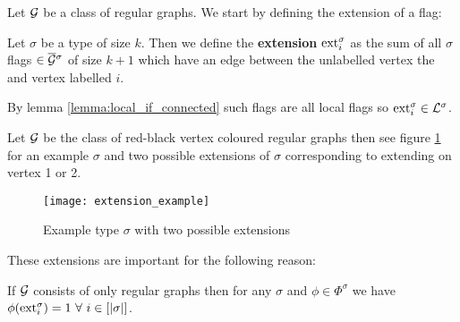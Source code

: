 Let $\mathcal{G}$ be a class of regular graphs.
We start by defining the extension of a flag:

\begin{definition}[Extension]
    Let $\sigma$ be a type of size $k$. Then we define the
    \textbf{extension} $\mathrm{ext}^\sigma_i$ as the sum of all $\sigma$ flags $\in\overline{\mathcal{G}}{}^\sigma$
    of size $k+1$ which have an edge between the unlabelled vertex the and vertex labelled $i$.
\end{definition}

\begin{note}
    By lemma \ref{lemma:local_if_connected} such flags are all local flags so
    $\mathrm{ext}^\sigma_i \in \mathcal{L}^\sigma$.
\end{note}

\begin{example}
    Let $\mathcal{G}$ be the class of red-black vertex coloured regular graphs then
    see figure \ref{fig:extension_example} for an example $\sigma$ and two possible
    extensions of $\sigma$ corresponding to extending on vertex 1 or 2.
    \begin{figure}[ht]
        \centering
        \texttt{[image: extension\_example]}
        \caption{Example type $\sigma$ with two possible extensions}
        \label{fig:extension_example}
    \end{figure}
\end{example}

These extensions are important for the following reason:

\begin{lemma}
    If $\mathcal{G}$ consists of only regular graphs then for any $\sigma$ and $\phi\in\Phi^\sigma$ we have
    $\phi(\mathrm{ext}_i^\sigma) = 1\ \forall\ i \in [|\sigma|]$.
\end{lemma}

